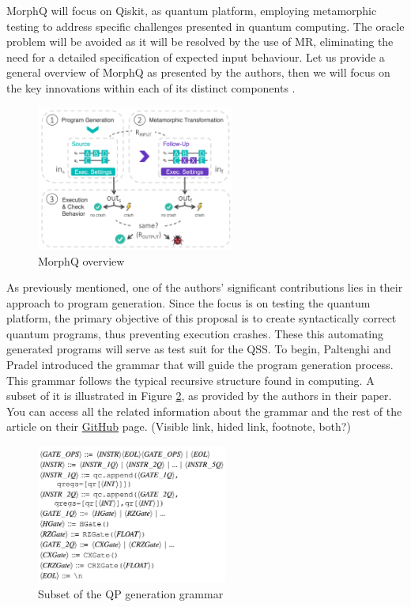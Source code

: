 \begin{itemize}
MorphQ will focus on Qiskit, as quantum platform, employing metamorphic testing to address specific challenges presented in quantum computing. The oracle problem will be avoided as it will be resolved by the use of MR, eliminating the need for a detailed specification of expected input behaviour. Let us provide a general overview of MorphQ as presented by the authors, then we will focus on the key innovations within each of its distinct components .

\begin{figure}[H]
        \centering
        \includegraphics[width=0.58\textwidth]{TFM/photos/MorphQOverview.png}
        \caption{MorphQ overview \cite{paltenghi2023morphq}} 
        \label{Fig:MorphQOverview}
\end{figure}

\vspace{-12pt}
As previously mentioned, one of the authors' significant contributions lies in their approach to program generation. Since the focus is on testing the quantum platform, the primary objective of this proposal is to create syntactically correct quantum programs, thus preventing execution crashes. These this automating generated programs will serve as test suit for the QSS. To begin, Paltenghi and Pradel introduced the grammar that will guide the program generation process. This grammar follows the typical recursive structure found in computing. A subset of it is illustrated in Figure \ref{Fig:MorphQGrammar}, as provided by the authors in their paper. You can access all the related information about the grammar and the rest of the article on their \hyperlink{https://github.com/sola-st/MorphQ-Quantum-Qiskit-Testing-ICSE-23}{GitHub} page. (Visible link, hided link, footnote, both?)

\vspace{-8pt}
\begin{figure}[H]
        \centering
        \includegraphics[width=0.56\textwidth]{TFM/photos/MorphQGrammar.png}
        \caption{Subset of the QP generation grammar \cite{paltenghi2023morphq}} 
        \label{Fig:MorphQGrammar}
\end{figure}


\end{itemize}
